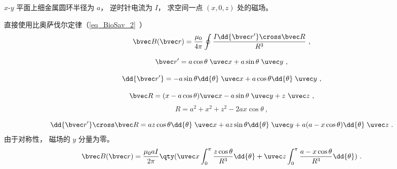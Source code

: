 
\begin{issues}
\issueDraft
\end{issues}


$x$-$y$ 平面上细金属圆环半径为 $a$， 逆时针电流为 $I$， 求空间一点 $(x, 0, z)$ 处的磁场。

直接使用比奥萨伐尔定律（\autoref{eq_BioSav_2}~）
\begin{equation}
\bvec B(\bvec r) = \frac{\mu_0}{4\pi} \oint \frac{I \dd{\bvec r'} \cross \bvec R}{R^3}~,
\end{equation}

\begin{equation}
\bvec r' = a\cos\theta\; \uvec x + a\sin\theta\; \uvec y~,
\end{equation}

\begin{equation}
\dd{\bvec r'} = -a\sin \theta \dd{\theta}\; \uvec x + a\cos \theta \dd{\theta}\; \uvec y~,
\end{equation}

\begin{equation}
\bvec R = (x - a\cos\theta)\uvec x - a\sin\theta \;\uvec y+ z\ \uvec z~,
\end{equation}
\begin{equation}
R = a^2 + x^2 + z^2 - 2ax\cos\theta~,
\end{equation}

\begin{equation}
\dd{\bvec r'} \cross \bvec R = az \cos\theta \dd{\theta} \;\uvec x + az\sin\theta \dd{\theta} \;\uvec y + a(a - x\cos\theta)\dd{\theta}\;\uvec z~.
\end{equation}
由于对称性， 磁场的 $y$ 分量为零。
\begin{equation}
\bvec B(\bvec r) = \frac{\mu_0 a I}{2\pi} \qty(\uvec x\int_0^\pi \frac{z \cos\theta}{R^3} \dd{\theta} + \uvec z\int_0^\pi \frac{a - x\cos\theta}{R^3} \dd{\theta})~.
\end{equation}
